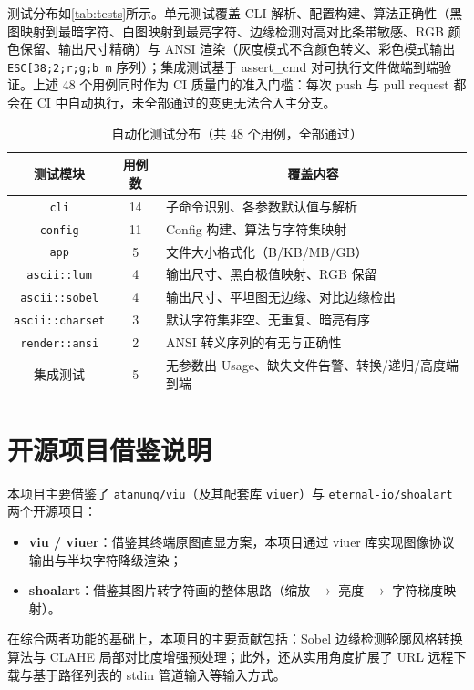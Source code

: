 \documentclass{SYSUReport}
\begin{document}
测试分布如\autoref{tab:tests}所示。单元测试覆盖 CLI 解析、配置构建、算法正确性（黑图映射到最暗字符、白图映射到最亮字符、边缘检测对高对比条带敏感、RGB 颜色保留、输出尺寸精确）与 ANSI 渲染（灰度模式不含颜色转义、彩色模式输出 \verb|ESC[38;2;r;g;b m| 序列）；集成测试基于 assert\_cmd 对可执行文件做端到端验证。上述 48 个用例同时作为 CI 质量门的准入门槛：每次 push 与 pull request 都会在 CI 中自动执行，未全部通过的变更无法合入主分支。

\begin{table}[!htbp]
    \centering
    \caption{自动化测试分布（共 48 个用例，全部通过）}
    \label{tab:tests}
    \begin{tabular}{ccp{24em}}
        \toprule
        测试模块 & 用例数 & \multicolumn{1}{c}{覆盖内容} \\
        \midrule
        \texttt{cli}            & 14 & 子命令识别、各参数默认值与解析 \\
        \texttt{config}         & 11 & Config 构建、算法与字符集映射 \\
        \texttt{app}            & 5  & 文件大小格式化（B/KB/MB/GB） \\
        \texttt{ascii::lum}     & 4  & 输出尺寸、黑白极值映射、RGB 保留 \\
        \texttt{ascii::sobel}   & 4  & 输出尺寸、平坦图无边缘、对比边缘检出 \\
        \texttt{ascii::charset} & 3  & 默认字符集非空、无重复、暗亮有序 \\
        \texttt{render::ansi}   & 2  & ANSI 转义序列的有无与正确性 \\
        集成测试                & 5  & 无参数出 Usage、缺失文件告警、转换/递归/高度端到端 \\
        \bottomrule
    \end{tabular}
\end{table}

\section{开源项目借鉴说明}

本项目主要借鉴了 \texttt{atanunq/viu}（及其配套库 \texttt{viuer}）与 \texttt{eternal-io/shoalart} 两个开源项目：

\begin{itemize}
    \item \textbf{viu / viuer}：借鉴其终端原图直显方案，本项目通过 viuer 库实现图像协议输出与半块字符降级渲染；
    \item \textbf{shoalart}：借鉴其图片转字符画的整体思路（缩放 $\rightarrow$ 亮度 $\rightarrow$ 字符梯度映射）。
\end{itemize}

在综合两者功能的基础上，本项目的主要贡献包括：Sobel 边缘检测轮廓风格转换算法与 CLAHE 局部对比度增强预处理；此外，还从实用角度扩展了 URL 远程下载与基于路径列表的 stdin 管道输入等输入方式。
\end{document}

